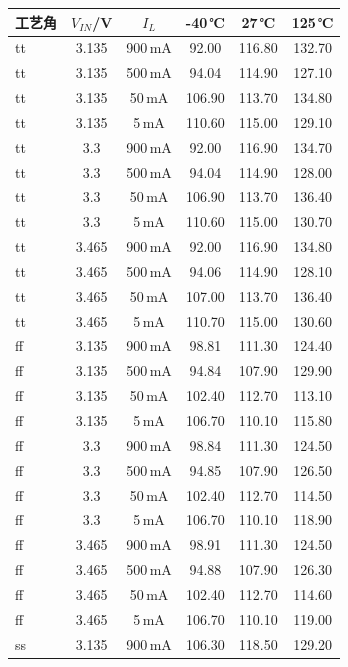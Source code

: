 \documentclass[a4paper, 12pt]{article}
\begin{document}
\begin{table}[H]
  \centering
  \scriptsize
  \setlength{\tabcolsep}{4pt}
  \begin{tabular}{lccccc}
    \toprule
    工艺角 & $V_{IN}$/V & $I_L$ & -40\,℃ & 27\,℃ & 125\,℃ \\
    \midrule
    tt & 3.135 & 900\,mA & 92.00 & 116.80 & 132.70 \\
    tt & 3.135 & 500\,mA & 94.04 & 114.90 & 127.10 \\
    tt & 3.135 & 50\,mA & 106.90 & 113.70 & 134.80 \\
    tt & 3.135 & 5\,mA & 110.60 & 115.00 & 129.10 \\
    tt & 3.3 & 900\,mA & 92.00 & 116.90 & 134.70 \\
    tt & 3.3 & 500\,mA & 94.04 & 114.90 & 128.00 \\
    tt & 3.3 & 50\,mA & 106.90 & 113.70 & 136.40 \\
    tt & 3.3 & 5\,mA & 110.60 & 115.00 & 130.70 \\
    tt & 3.465 & 900\,mA & 92.00 & 116.90 & 134.80 \\
    tt & 3.465 & 500\,mA & 94.06 & 114.90 & 128.10 \\
    tt & 3.465 & 50\,mA & 107.00 & 113.70 & 136.40 \\
    tt & 3.465 & 5\,mA & 110.70 & 115.00 & 130.60 \\
    \midrule
    ff & 3.135 & 900\,mA & 98.81 & 111.30 & 124.40 \\
    ff & 3.135 & 500\,mA & 94.84 & 107.90 & 129.90 \\
    ff & 3.135 & 50\,mA & 102.40 & 112.70 & 113.10 \\
    ff & 3.135 & 5\,mA & 106.70 & 110.10 & 115.80 \\
    ff & 3.3 & 900\,mA & 98.84 & 111.30 & 124.50 \\
    ff & 3.3 & 500\,mA & 94.85 & 107.90 & 126.50 \\
    ff & 3.3 & 50\,mA & 102.40 & 112.70 & 114.50 \\
    ff & 3.3 & 5\,mA & 106.70 & 110.10 & 118.90 \\
    ff & 3.465 & 900\,mA & 98.91 & 111.30 & 124.50 \\
    ff & 3.465 & 500\,mA & 94.88 & 107.90 & 126.30 \\
    ff & 3.465 & 50\,mA & 102.40 & 112.70 & 114.60 \\
    ff & 3.465 & 5\,mA & 106.70 & 110.10 & 119.00 \\
    \midrule
    ss & 3.135 & 900\,mA & 106.30 & 118.50 & 129.20 \\

\end{tabular}
\end{table}
\end{document}
